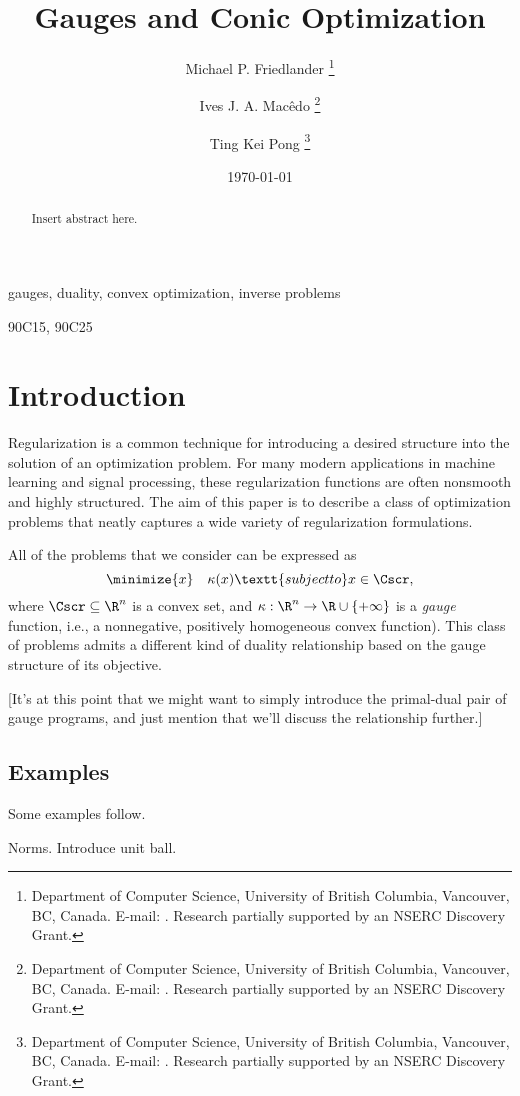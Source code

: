 \documentclass{siamltex}   %
\title{
  Gauges and Conic Optimization
}
\author{
  Michael P. Friedlander%
  \thanks{%
    Department of Computer Science,
    University of British Columbia,
    Vancouver, BC, Canada.
    E-mail: \mailto{mpf@cs.ubc.ca}.
    Research partially supported by an NSERC Discovery Grant.
  }
  \and
  Ives J. A. Mac\^edo%
  \thanks{%
    Department of Computer Science,
    University of British Columbia,
    Vancouver, BC, Canada.
    E-mail: \mailto{ijamj@cs.ubc.ca}.
    Research partially supported by an NSERC Discovery Grant.
  }
  \and
  Ting Kei Pong%
  \thanks{%
    Department of Computer Science,
    University of British Columbia,
    Vancouver, BC, Canada.
    E-mail: \mailto{tkpong@cs.ubc.ca}.
    Research partially supported by an NSERC Discovery Grant.
  }
}
\date{\today}
\begin{document}
  \maketitle

  \thispagestyle{plain}
  \pagestyle{myheadings}

  \begin{abstract}
    Insert abstract here.
  \end{abstract}
  \begin{keywords}
    gauges, duality, convex optimization, inverse problems
  \end{keywords}
  \begin{AMS}
    90C15, 90C25
  \end{AMS}

  \tableofcontents
  \listoftodos\relax


  \section{Introduction}

  Regularization is a common technique for introducing a desired
  structure into the solution of an optimization problem. For many
  modern applications in machine learning and signal processing, these
  regularization functions are often nonsmooth and highly
  structured. The aim of this paper is to describe a class of
  optimization problems that neatly captures a wide variety of
  regularization formulations.

  All of the problems that we consider can be expressed as
  \begin{equation}
    \label{eq:1}
    \minimize{x} \quad \kappa(x) \textt{subject to} x\in\Cscr,
  \end{equation}
  where $\Cscr\subseteq\R^{n}$ is a convex set, and
  $\kappa:\R^{n}\to\R\cup\{+\infty\}$ is a \emph{gauge} function,
  i.e., a nonnegative, positively homogeneous convex function). This
  class of problems admits a different kind of duality relationship
  based on the gauge structure of its objective.

  [It's at this point that we might want to simply introduce the
  primal-dual pair of gauge programs, and just mention that we'll
  discuss the relationship further.]

  \subsection{Examples}

  Some examples follow.
  \begin{example}
    Norms. Introduce unit ball.
  \end{example}
\end{document}
